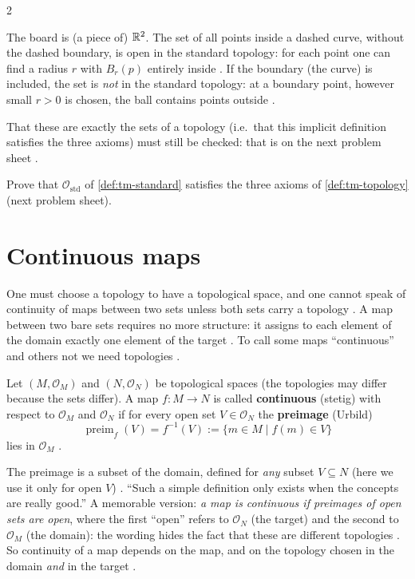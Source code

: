 \begin{paracol}{2}
\begin{example}\label{ex:tm-open-r2}
The board is (a piece of) $\mathbb{R}^2$. The set of all points inside a dashed curve, without the dashed boundary, is open in the
standard topology: for each point one can find a radius $r$ with $B_r(p)$ entirely inside .
If the boundary (the curve) is included, the set is \emph{not} in the standard topology: at a boundary point, however
small $r>0$ is chosen, the ball contains points outside .
\end{example}
That these are exactly the sets of a topology (i.e.\ that this implicit definition satisfies the three axioms) must
still be checked: that is on the next problem sheet .
\begin{exercise}\label{ex:tm-std-is-top}
Prove that $\mathcal O_{\mathrm{std}}$ of \cref{def:tm-standard} satisfies the three axioms of \cref{def:tm-topology}
(next problem sheet).
\end{exercise}

\section{Continuous maps}\label{sec:tm-continuous}

One must choose a topology to have a topological space, and one cannot speak of continuity of maps between two sets unless
both sets carry a topology . A map between two bare sets requires no more
structure: it assigns to each element of the domain exactly one element of the target .
To call some maps ``continuous'' and others not we need topologies .

\begin{definition}\label{def:tm-continuous}
Let $(M,\mathcal O_M)$ and $(N,\mathcal O_N)$ be topological spaces (the topologies may differ because the sets
differ). A map $f\colon M\to N$ is called \textbf{continuous} (stetig) with respect to $\mathcal O_M$ and $\mathcal O_N$
if for every open set $V\in\mathcal O_N$ the \textbf{preimage} (Urbild)
\[
  \operatorname{preim}_f(V)=f^{-1}(V):=\{m\in M\mid f(m)\in V\}
\]
lies in $\mathcal O_M$ .
\end{definition}
The preimage is a subset of the domain, defined for \emph{any} subset $V\subseteq N$ (here we use it only for open $V$)
. ``Such a simple definition only exists when the concepts are really good.''
A memorable version: \emph{a map is continuous if preimages of open sets are open}, where the first ``open'' refers to
$\mathcal O_N$ (the target) and the second to $\mathcal O_M$ (the domain): the wording hides the fact that these are
different topologies . So continuity of a map depends on the map, and on the
topology chosen in the domain \emph{and} in the target .


\end{paracol}
